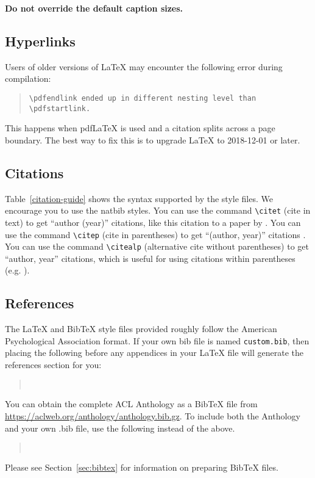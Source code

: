 \documentclass[11pt]{article}
\begin{document}
\textbf{Do not override the default caption sizes.}

\subsection{Hyperlinks}

Users of older versions of \LaTeX{} may encounter the following error during compilation: 
\begin{quote}
\tt\verb|\pdfendlink| ended up in different nesting level than \verb|\pdfstartlink|.
\end{quote}
This happens when pdf\LaTeX{} is used and a citation splits across a page boundary. The best way to fix this is to upgrade \LaTeX{} to 2018-12-01 or later.

\subsection{Citations}



Table~\ref{citation-guide} shows the syntax supported by the style files.
We encourage you to use the natbib styles.
You can use the command \verb|\citet| (cite in text) to get ``author (year)'' citations, like this citation to a paper by \citet{Gusfield:97}.
You can use the command \verb|\citep| (cite in parentheses) to get ``(author, year)'' citations \citep{Gusfield:97}.
You can use the command \verb|\citealp| (alternative cite without parentheses) to get ``author, year'' citations, which is useful for using citations within parentheses (e.g. \citealp{Gusfield:97}).

\subsection{References}

\nocite{Ando2005,augenstein-etal-2016-stance,andrew2007scalable,rasooli-tetrault-2015,goodman-etal-2016-noise,harper-2014-learning}

The \LaTeX{} and Bib\TeX{} style files provided roughly follow the American Psychological Association format.
If your own bib file is named \texttt{custom.bib}, then placing the following before any appendices in your \LaTeX{} file will generate the references section for you:
\begin{quote}
\begin{verbatim}


\end{verbatim}
\end{quote}
You can obtain the complete ACL Anthology as a Bib\TeX{} file from \url{https://aclweb.org/anthology/anthology.bib.gz}.
To include both the Anthology and your own .bib file, use the following instead of the above.
\begin{quote}
\begin{verbatim}


\end{verbatim}
\end{quote}
Please see Section~\ref{sec:bibtex} for information on preparing Bib\TeX{} files.
\end{document}
